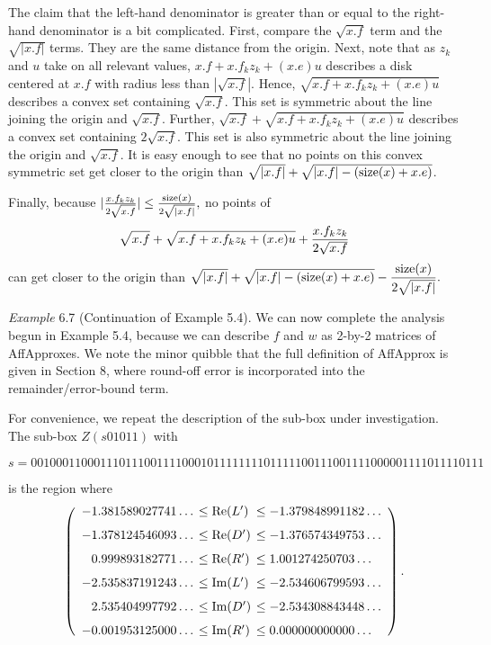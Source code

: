 The claim that the left-hand denominator is greater than or equal to the right-hand denominator is a bit complicated.  First, compare the $\sqrt{x.f}$ term and the $\sqrt{|x.f|}$ terms.  They are the same distance from the origin.  Next, note that as $z_k$ and $u$ take on all
relevant values, $x.f + x.f_k z_k + (x.e) u$ describes a disk centered at $x.f$
with radius   less than $ |\sqrt {x.f}|$.  Hence, $\sqrt {x.f + x.f_k z_k + (x.e) u}$ describes a convex set containing $\sqrt{x.f}$.  This set
is symmetric about the line joining the origin and $\sqrt{x.f}$. Further, $\sqrt{x.f} + \sqrt {x.f + x.f_k z_k + (x.e) u}$ describes a convex
set containing $2 \sqrt{x.f}$.   This set is also symmetric about the line joining the origin and  $\sqrt{x.f}$.
It is easy enough to see that no points on this convex symmetric set get closer to the origin than $\sqrt{|x.f|}  + \sqrt {|x.f| - ({\rm size}(x) + x.e)}$.

Finally, because $|{x.f_k z_k \over 2 \sqrt{x.f}}| \le {{\rm size}(x) \over 2 \sqrt {|x.f|}},$ no points of $$\sqrt {x.f} + \sqrt {x.f + x.f_k z_k + (x.e) u} + 
{x.f_k z_k \over 2 \sqrt{x.f}}$$
can get closer to the origin than
\hfill ${\displaystyle \sqrt{|x.f|} + \sqrt {|x.f| - ({\rm size}(x) + x.e)} - 
{{\rm size}(x) \over 2 \sqrt {|x.f|}}.} $ \enddemo

{\it Example} 6.7 (Continuation of Example 5.4).
We can now complete the analysis begun in Example 5.4, because we can describe $f$ and $w$ as 2-by-2 matrices of AffApproxes.
We note the minor quibble that the full definition of AffApprox is
given in Section 8, where round-off error is incorporated into
the remainder/error-bound term.

For convenience,
we repeat the description of the sub-box under investigation.
The sub-box $Z(s01011)$ with  
\begin{small}
$$s = 001000110001110111001111000101111111101111100111001111000001111011110111$$ 
\end{small}%

\noindent is the region where
$$\left(\begin{array}{rll}
-1.381589027741\ldots &\hskip-6pt \le  {\rm Re}(L')&  \hskip-6pt\le  -1.379848991182\ldots\\[7pt]
-1.378124546093\ldots &\hskip-6pt \le  {\rm Re}(D')&\hskip-6pt  \le  -1.376574349753\ldots\\[7pt]
0.999893182771\ldots  &\hskip-6pt\le {\rm Re}(R')& \hskip-6pt  \le  1.001274250703\ldots\\[7pt]
-2.535837191243\ldots &\hskip-6pt \le  {\rm Im}(L')&\hskip-6pt  \le  -2.534606799593\ldots\\[7pt]
2.535404997792\ldots & \hskip-6pt\le  {\rm Im}(D') &\hskip-6pt \le  -2.534308843448\ldots\\[7pt]
-0.001953125000\ldots &\hskip-6pt \le {\rm  Im}(R')&\hskip-6pt  \le  0.000000000000\ldots
\end{array}\right).$$ 

